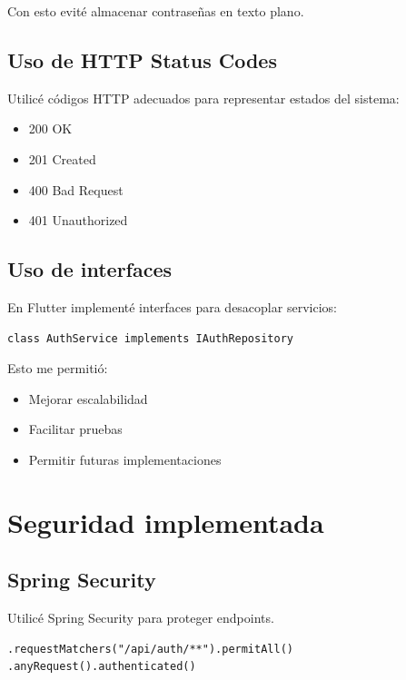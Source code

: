 \documentclass[12pt,a4paper]{article}
\begin{document}
Con esto evité almacenar contraseñas en texto plano.

\subsection{Uso de HTTP Status Codes}

Utilicé códigos HTTP adecuados para representar estados del sistema:

\begin{itemize}
    \item 200 OK
    \item 201 Created
    \item 400 Bad Request
    \item 401 Unauthorized
\end{itemize}

\subsection{Uso de interfaces}

En Flutter implementé interfaces para desacoplar servicios:

\begin{lstlisting}
class AuthService implements IAuthRepository
\end{lstlisting}

Esto me permitió:

\begin{itemize}
    \item Mejorar escalabilidad
    \item Facilitar pruebas
    \item Permitir futuras implementaciones
\end{itemize}

\section{Seguridad implementada}

\subsection{Spring Security}

Utilicé Spring Security para proteger endpoints.

\begin{lstlisting}
.requestMatchers("/api/auth/**").permitAll()
.anyRequest().authenticated()
\end{lstlisting}
\end{document}
